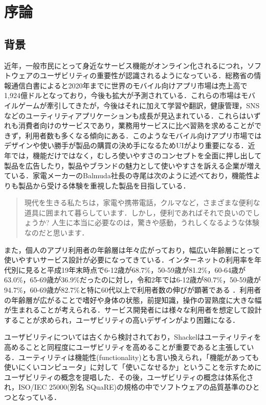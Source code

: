 \chapter{序論}
\label{chap:introduction}

\section{背景}

近年，一般市民にとって身近なサービス機能がオンライン化されるにつれ，ソフトウェアのユーザビリティの重要性が認識されるようになっている\cite{kurosu}．総務省の情報通信白書によると2020年までに世界のモバイル向けアプリ市場は売上高で1,924億ドルとなっており，今後も拡大が予測されている．これらの市場はモバイルゲームが牽引してきたが，今後はそれに加えて学習や翻訳，健康管理，SNSなどのユーティリティアプリケーションも成長が見込まれている\cite{hakusyo}．これらはいずれも消費者向けのサービスであり，業務用サービスに比べ習熟を求めることができず，利用者数も多くなる傾向にある．このようなモバイル向けアプリ市場ではデザインや使い勝手が製品の購買の決め手になるためUIがより重要になる．近年では，機能だけではなく，むしろ使いやすさのコンセプトを全面に押し出して製品を広告したり，製品やブランドの魅力として使いやすさを訴える企業が増えている\cite{tullis2014}．家電メーカーのBalmuda社長の寺尾は次のように述べており，機能性よりも製品から受ける体験を重視した製品を目指している．\begin{quotation}
  現代を生きる私たちは，家電や携帯電話，クルマなど，さまざまな便利な道具に囲まれて暮らしています．しかし，便利であればそれで良いのでしょうか? 人生に本当に必要なのは，驚きや感動，うれしくなるような体験なのだと思います\cite{terao}．
\end{quotation}

また，個人のアプリ利用者の年齢層は年々広がっており，幅広い年齢層にとって使いやすいサービス設計が必要になってきている．インターネットの利用率を年代別に見ると平成19年末時点で6-12歳が68.7\%，50-59歳が81.2\%，60-64歳が63.0\%，65-69歳が36.9\%だったのに対し，令和2年では6-12歳が80.7\%，50-59歳が94.7\%，60-69歳が82.7\%と特に60代以上で利用者数の伸びが顕著である\cite{doukou1}\cite{doukou2} ．利用者の年齢層が広がることで嗜好や身体の状態，前提知識，操作の習熟度に大きな幅が生まれることが考えられる．サービス開発者には様々な利用者を想定して設計することが求められ，ユーザビリティの高いデザインがより困難になる．

ユーザビリティについては古くから検討されており，Shackel\cite{shackel1991human}はユーティリティを高めることと同程度にユーザビリティを高めることが重要であると主張している．ユーティリティは機能性(functionality)とも言い換えられ，「機能があっても使いにくいコンピュータ」に対して「使いこなせるか」ということを示すためにユーザビリティの概念を提唱した\cite{kurosu}．その後，ユーザビリティの概念は体系化され，ISO/IEC 25000(別名 SQuaRE)の規格の中でソフトウェアの品質基準のひとつとなっている．

